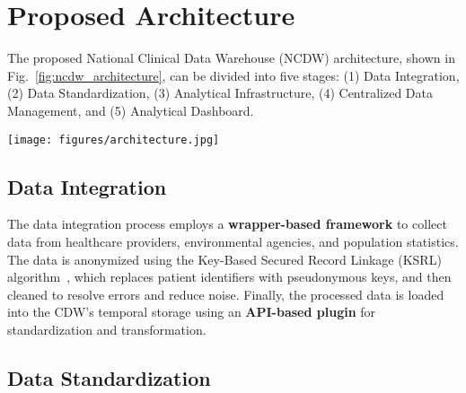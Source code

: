 \section{Proposed Architecture}
\label{sec:methodology}

The proposed National Clinical Data Warehouse (NCDW) architecture, shown in Fig.~\ref{fig:ncdw_architecture}, can be divided into five stages: (1) Data Integration, (2) Data Standardization, (3) Analytical Infrastructure, (4) Centralized Data Management, and (5) Analytical Dashboard. 


\begin{figure*}[ht]
    \centering
    \texttt{[image: figures/architecture.jpg]}
    \caption{Wrapper-based Architecture of NCDW Supporting Dengue Data Mart}
    \label{fig:ncdw_architecture}
    \vspace{-3mm}
\end{figure*}

\subsection{Data Integration}
\label{subsec:data_integration}

The data integration process employs a \textbf{wrapper-based framework} to collect data from healthcare providers, environmental agencies, and population statistics. The data is anonymized using the Key-Based Secured Record Linkage (KSRL) algorithm~\cite{ksrl}, which replaces patient identifiers with pseudonymous keys, and then cleaned to resolve errors and reduce noise. Finally, the processed data is loaded into the CDW's temporal storage using an \textbf{API-based plugin} for standardization and transformation.




\subsection{Data Standardization}
\label{subsec:data_standardization}


